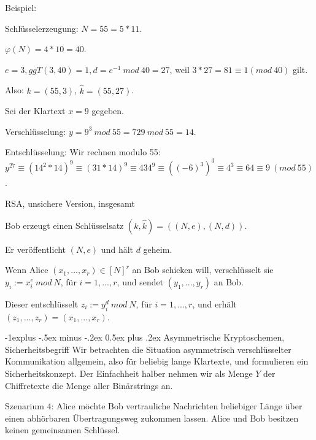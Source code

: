 \documentclass[a4paper]{article}
\makeatletter
\renewcommand{\subsection}{\@startsection{subsection}{2}{0mm}%
 {-1explus -.5ex minus -.2ex}%
 {0.5ex plus .2ex}%
 {\normalfont\normalsize\bfseries}}
\makeatother
\begin{document}
\begin{multicols}{3}
        Beispiel:
        \begin{itemize*}
            \item Schlüsselerzeugung: $N= 55 = 5*11$.
            \item $\varphi(N) = 4*10 = 40$.
            \item $e= 3, ggT(3,40) = 1, d=e^{-1}\ mod\ 40 = 27$, weil $3*27 = 81\equiv 1 (mod\ 40)$ gilt.
            \item Also: $k= (55,3)$, $\hat{k}= (55,27)$.
            \item Sei der Klartext $x=9$ gegeben.
            \item Verschlüsselung: $y= 9^3\ mod\ 55 = 729\ mod\ 55 = 14$.
            \item Entschlüsselung: Wir rechnen modulo 55: $y^{27}\equiv (14^2 * 14)^9 \equiv (31*14)^9 \equiv 434^9 \equiv ((-6)^3)^3 \equiv 4^3 \equiv 64 \equiv 9\ (mod\ 55)$.
        \end{itemize*}

        RSA, unsichere Version, insgesamt
        \begin{itemize*}
            \item Bob erzeugt einen Schlüsselsatz $(k, \hat{k}) = ((N,e),(N,d))$.
            \item Er veröffentlicht $(N,e)$ und hält $d$ geheim.
            \item Wenn Alice $(x_1,...,x_r)\in [N]^r$ an Bob schicken will, verschlüsselt sie $y_i:=x^e_i\ mod\ N$, für $i=1,...,r$, und sendet $(y_1,...,y_r)$ an Bob.
            \item Dieser entschlüsselt $z_i:=y^d_i\ mod\ N$, für $i=1,...,r$, und erhält $(z_1,...,z_r) = (x_1,...,x_r)$.
        \end{itemize*}

        \subsection{Asymmetrische Kryptoschemen, Sicherheitsbegriff}
        Wir betrachten die Situation asymmetrisch verschlüsselter Kommunikation allgemein, also für beliebig lange Klartexte, und formulieren ein Sicherheitskonzept. Der Einfachheit halber nehmen wir als Menge $Y$ der Chiffretexte die Menge aller Binärstrings an.

        Szenarium 4: Alice möchte Bob vertrauliche Nachrichten beliebiger Länge über einen abhörbaren Übertragungsweg zukommen lassen. Alice und Bob besitzen keinen gemeinsamen Schlüssel.


\end{multicols}
\end{document}
